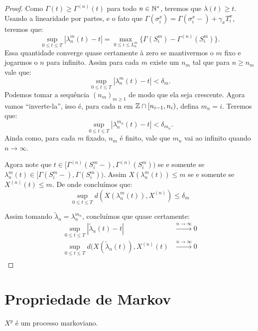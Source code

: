 \begin{proof}
  Como $\Gamma(t) \geq \Gamma^{(n)}(t)$ para todo $n \in {\mathbb{N^*}}$, teremos
  que $\lambda(t) \geq t$. Usando a linearidade por partes, e o fato
  que $\Gamma(\sigma^x_i) = \Gamma(\sigma_i^x-) + \gamma_x T^x_i$,
  teremos que:
  \begin{displaymath}
    \sup_{0 \leq t \leq T} |\lambda_n^m(t) - t| =
    \max_{0 \leq i \leq L_n^m} \{ \Gamma(S_i^m) -
    \Gamma^{(n)}(S_i^m)\}.
  \end{displaymath}
  Essa quantidade converge quase certamente à zero se mantivermos o
  $m$ fixo e jogarmos o $n$ para infinito. Assim para cada $m$ existe
  um $n_m$ tal que para $n \geq n_m$ vale que:
  \begin{displaymath}
    \sup_{0 \leq t \leq T} |\lambda_n^m(t) - t| < \delta_m.
  \end{displaymath}
  Podemos tomar a sequência $(n_m)_{m \geq 1}$ de modo que ela seja
  crescente. Agora vamos ``inverte-la'', isso é, para cada n em ${\mathbb{Z}}
  \cap [n_{i-1}, n_i)$, defina $m_n = i$. Teremos que:
  \begin{displaymath}
    \sup_{0 \leq t \leq T} |\lambda_n^{m_n}(t) - t| < \delta_{m_n}.
  \end{displaymath}
  Ainda como, para cada $m$ fixado, $n_m$ é finito, vale que $m_n$ vai
  ao infinito quando $n \to \infty$.
  
  Agora note que $t \in [\Gamma^{(n)}(S_{i}^m-),
  \Gamma^{(n)}(S_{i}^m))$ se e somente se $\lambda_n^m(t) \in
  [\Gamma(S_{i}^m-), \Gamma(S_{i}^m))$. Assim $X(\lambda_n^m(t)) \leq
  m$ se e somente se $X^{(n)}(t) \leq m$. De onde concluímos que:
  \begin{displaymath}
    \sup_{0 \leq t \leq T} d\left(X(\lambda_n^m(t)), X^{(n)}\right)
    \leq \delta_m
  \end{displaymath}

  Assim tomando $\tilde{\lambda}_n = \lambda_n^{m_n}$, concluímos que
  quase certamente:
  \begin{align*}
    \sup_{0 \leq t \leq T} |\tilde{\lambda}_n(t) - t|
    &\xrightarrow{n\to\infty} 0 \\
    \sup_{0 \leq t \leq T} d(X(\tilde{\lambda}_n(t)), X^{(n)}(t)
    &\xrightarrow{n\to\infty} 0 \\
  \end{align*}
\end{proof}


\section{Propriedade de Markov}
\label{sec:prop-markov}
\begin{teorema}
  \label{teo:proc_markov}
  $X^y$ é um processo markoviano.
\end{teorema}

